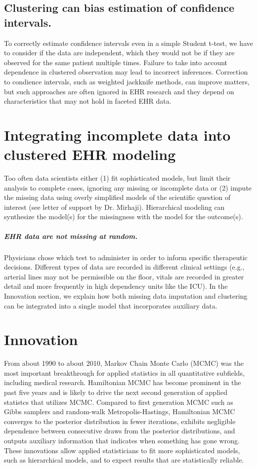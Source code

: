 \documentclass[11pt,notitlepage]{article}
\begin{document}
\subsection*{Clustering can bias estimation of confidence intervals.} To 
correctly estimate confidence intervals even in a simple Student t-test, 
we have to consider if the data are independent, which they would not be if
they are observed for the same patient multiple times. Failure to take into 
account dependence in clustered observation may lead to incorrect inferences. 
Correction to condience intervals, such as weighted jackknife methods, can 
improve matters, but such approaches are often ignored in EHR research 
and they depend on characteristics that may not hold in faceted EHR data. 

\section*{Integrating incomplete data into clustered EHR modeling}
Too often data scientists either (1) fit sophisticated models, but limit their analysis 
to complete cases, ignoring any missing or incomplete data or (2) impute the missing 
data using overly simplified models of the scientific question of interest (see letter of 
support by Dr. Mirhaji). Hierarchical modeling can synthesize the model(s) for the missingness
with the model for the outcome(s).

\subparagraph*{EHR data are not missing at random.}
Physicians chose which test to administer in order
to inform specific therapeutic decisions. Different types of data are recorded 
in different clinical settings (e.g., arterial lines may not be permissible on the 
floor, vitals are recorded in greater detail and more frequently in high dependency 
units like the ICU). In the Innovation section, we explain how both missing data 
imputation and clustering can be integrated into a single model that 
incorporates auxiliary data.

\section*{Innovation}

From about 1990 to about 2010, Markov Chain Monte Carlo (MCMC) was the most
important breakthrough for applied statistics in all quantitative subfields,
including medical research. Hamiltonian MCMC has become prominent in the 
past five years and is likely to drive the next second generation of applied
statistcs that utilizes MCMC. Compared to first generation MCMC such as 
Gibbs samplers and random-walk Metropolis-Hastings, Hamiltonian MCMC converges
to the posterior distribution in fewer iterations, exhibits negligible dependence
between consecutive draws from the posterior distributions, and outputs auxiliary
information that indicates when something has gone wrong. These innovations allow
applied statisticians to fit more sophisticated models, such as hierarchical models,
and to expect results that are statistically reliable.
\end{document}

